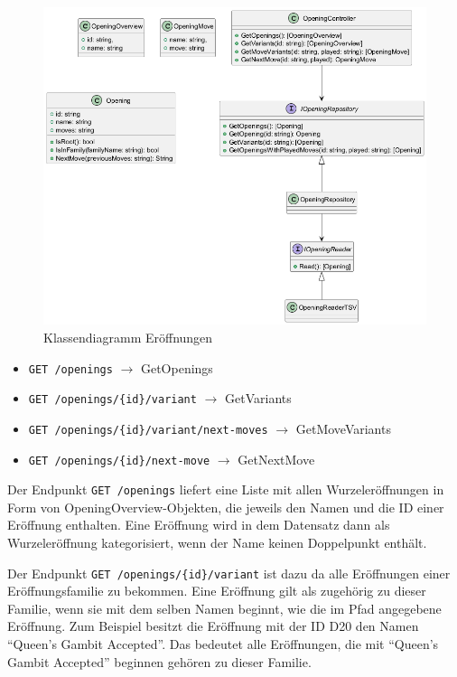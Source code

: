 \begin{figure}[htb]
  \includegraphics[width=\linewidth]{images/diagrams/opening.png}
  \caption{Klassendiagramm Eröffnungen}
  \label{fig:cd_opening}
\end{figure}

\begin{itemize}
  \item \lstinline|GET /openings| $\rightarrow$ GetOpenings
  \item \lstinline|GET /openings/{id}/variant| $\rightarrow$ GetVariants
  \item \lstinline|GET /openings/{id}/variant/next-moves| $\rightarrow$ GetMoveVariants
  \item \lstinline|GET /openings/{id}/next-move| $\rightarrow$ GetNextMove
\end{itemize}

Der Endpunkt \lstinline{GET /openings} liefert eine Liste mit allen Wurzeleröffnungen in Form von OpeningOverview-Objekten, die jeweils den Namen und die ID einer Eröffnung enthalten.
Eine Eröffnung wird in dem Datensatz \cite{lichessorg_chess-openings_2025} dann als Wurzeleröffnung kategorisiert, wenn der Name keinen Doppelpunkt enthält.

Der Endpunkt \lstinline|GET /openings/{id}/variant| ist dazu da alle Eröffnungen einer Eröffnungsfamilie zu bekommen. Eine Eröffnung gilt als zugehörig zu dieser Familie, wenn sie mit dem selben Namen beginnt, wie die im Pfad angegebene Eröffnung. Zum Beispiel besitzt die Eröffnung mit der ID D20 den Namen \enquote{Queen's Gambit Accepted}. Das bedeutet alle Eröffnungen, die mit \enquote{Queen's Gambit Accepted} beginnen gehören zu dieser Familie.

